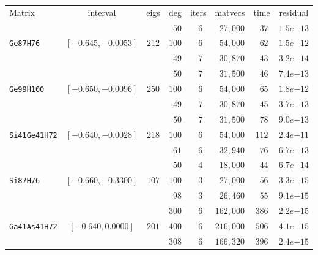\begin{tabular}{l|c|c|c|c|c|c|c}
\hline
\multirow{2}{*}{Matrix} & \multirow{2}{*}{interval} & \multirow{2}{*}{eigs} & \multirow{2}{*}{deg} & \multirow{2}{*}{iters} & \multirow{2}{*}{matvecs} & \multirow{2}{*}{time} & \multirow{2}{*}{residual} \\
 & & & & & & & \\\hline
\hline
 & & & $\phantom{0}50$ & $\phantom{0}6$ & $\phantom{0}27,000$ & $\phantom{0}37$ & $1.5e{-13}$ \\
\verb|Ge87H76| & $[-0.645,-0.0053]$ & $212$ & $100$ & $\phantom{0}6$ & $\phantom{0}54,000$ & $\phantom{0}62$ & $1.5e{-12}$ \\
 & & & $\phantom{0}49$ & $\phantom{0}7$ & $\phantom{0}30,870$ & $\phantom{0}43$ & $3.2e{-14}$ \\\hline
 & & & $\phantom{0}50$ & $\phantom{0}7$ & $\phantom{0}31,500$ & $\phantom{0}46$ & $7.4e{-13}$ \\
\verb|Ge99H100| & $[-0.650,-0.0096]$ & $250$ & $100$ & $\phantom{0}6$ & $\phantom{0}54,000$ & $\phantom{0}65$ & $1.8e{-12}$ \\
 & & & $\phantom{0}49$ & $\phantom{0}7$ & $\phantom{0}30,870$ & $\phantom{0}45$ & $3.7e{-13}$ \\\hline
 & & & $\phantom{0}50$ & $\phantom{0}7$ & $\phantom{0}31,500$ & $\phantom{0}78$ & $9.0e{-13}$ \\
\verb|Si41Ge41H72| & $[-0.640,-0.0028]$ & $218$ & $100$ & $\phantom{0}6$ & $\phantom{0}54,000$ & $112$ & $2.4e{-11}$ \\
 & & & $\phantom{0}61$ & $\phantom{0}6$ & $\phantom{0}32,940$ & $\phantom{0}76$ & $6.7e{-13}$ \\\hline
 & & & $\phantom{0}50$ & $\phantom{0}4$ & $\phantom{0}18,000$ & $\phantom{0}44$ & $6.7e{-14}$ \\
\verb|Si87H76| & $[-0.660,-0.3300]$ & $107$ & $100$ & $\phantom{0}3$ & $\phantom{0}27,000$ & $\phantom{0}56$ & $3.3e{-15}$ \\
 & & & $\phantom{0}98$ & $\phantom{0}3$ & $\phantom{0}26,460$ & $\phantom{0}55$ & $9.1e{-15}$ \\\hline
 & & & $300$ & $\phantom{0}6$ & $162,000$ & $386$ & $2.2e{-15}$ \\
\verb|Ga41As41H72| & $[-0.640,0.0000]$ & $201$ & $400$ & $\phantom{0}6$ & $216,000$ & $506$ & $4.1e{-15}$ \\
 & & & $308$ & $\phantom{0}6$ & $166,320$ & $396$ & $2.4e{-15}$ \\\hline
\end{tabular}